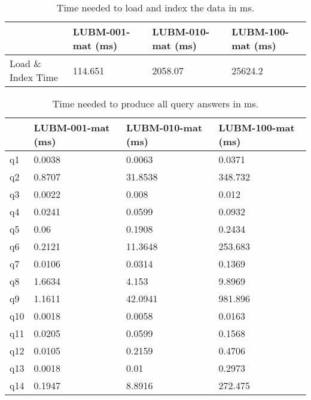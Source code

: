 \documentclass{article}
\begin{document}
\begin{enumerate}
\begin{table}[H]\centering
\begin{tabular}{|l|l|l|l|}
\hline
                   & LUBM-001-mat (ms) & LUBM-010-mat (ms) & LUBM-100-mat (ms)\\ \hline
Load \& Index Time & 114.651          & 2058.07        & 25624.2        \\ \hline
\end{tabular}
\caption{Time needed to load and index the data in ms.}
\end{table}


\begin{table}[H]\centering
\begin{tabular}{|l|l|l|l|}
\hline
	& LUBM-001-mat (ms) & LUBM-010-mat (ms) & LUBM-100-mat (ms) \\ \hline
q1  & 0.0038            & 0.0063            & 0.0371            \\ \hline
q2  & 0.8707            & 31.8538           & 348.732           \\ \hline
q3  & 0.0022            & 0.008             & 0.012             \\ \hline
q4  & 0.0241            & 0.0599            & 0.0932            \\ \hline
q5  & 0.06              & 0.1908            & 0.2434            \\ \hline
q6  & 0.2121            & 11.3648           & 253.683           \\ \hline
q7  & 0.0106            & 0.0314            & 0.1369            \\ \hline
q8  & 1.6634            & 4.153             & 9.8969            \\ \hline
q9  & 1.1611            & 42.0941           & 981.896           \\ \hline
q10 & 0.0018            & 0.0058            & 0.0163            \\ \hline
q11 & 0.0205            & 0.0599            & 0.1568            \\ \hline
q12 & 0.0105            & 0.2159            & 0.4706            \\ \hline
q13 & 0.0018            & 0.01              & 0.2973            \\ \hline
q14 & 0.1947            & 8.8916            & 272.475           \\ \hline
\end{tabular}
\caption{Time needed to produce  all query answers in ms.}
\end{table}


\end{enumerate}
\end{document}

